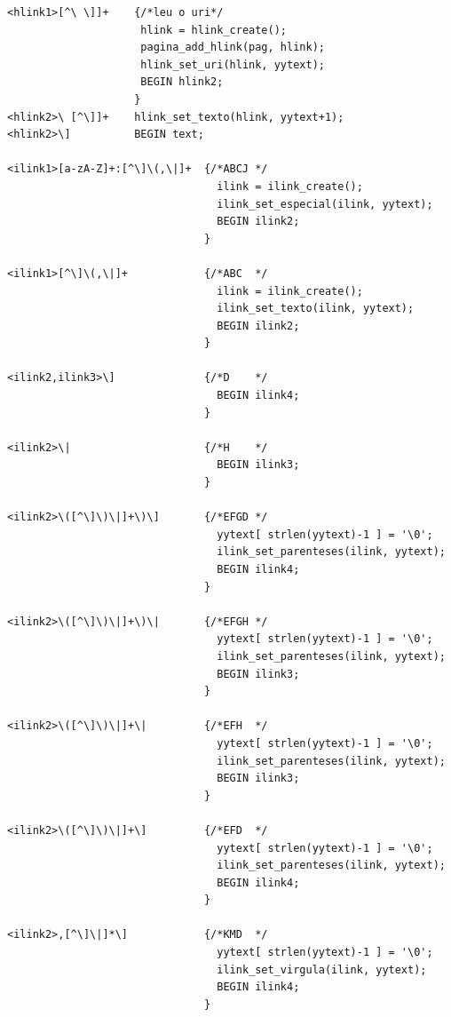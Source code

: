 \documentclass[11pt, a4paper, oneside]{article}
\begin{document}
\begin{verbatim}
<hlink1>[^\ \]]+    {/*leu o uri*/
                     hlink = hlink_create();
                     pagina_add_hlink(pag, hlink);
                     hlink_set_uri(hlink, yytext);
                     BEGIN hlink2;
                    }
<hlink2>\ [^\]]+    hlink_set_texto(hlink, yytext+1);
<hlink2>\]          BEGIN text;

<ilink1>[a-zA-Z]+:[^\]\(,\|]+  {/*ABCJ */
                                 ilink = ilink_create();
                                 ilink_set_especial(ilink, yytext);
                                 BEGIN ilink2;
                               }

<ilink1>[^\]\(,\|]+            {/*ABC  */
                                 ilink = ilink_create();
                                 ilink_set_texto(ilink, yytext);
                                 BEGIN ilink2;
                               }

<ilink2,ilink3>\]              {/*D    */
                                 BEGIN ilink4;
                               }

<ilink2>\|                     {/*H    */
                                 BEGIN ilink3;
                               }

<ilink2>\([^\]\)\|]+\)\]       {/*EFGD */
                                 yytext[ strlen(yytext)-1 ] = '\0';
                                 ilink_set_parenteses(ilink, yytext);
                                 BEGIN ilink4;
                               }

<ilink2>\([^\]\)\|]+\)\|       {/*EFGH */
                                 yytext[ strlen(yytext)-1 ] = '\0';
                                 ilink_set_parenteses(ilink, yytext);
                                 BEGIN ilink3;
                               }

<ilink2>\([^\]\)\|]+\|         {/*EFH  */
                                 yytext[ strlen(yytext)-1 ] = '\0';
                                 ilink_set_parenteses(ilink, yytext);
                                 BEGIN ilink3;
                               }

<ilink2>\([^\]\)\|]+\]         {/*EFD  */
                                 yytext[ strlen(yytext)-1 ] = '\0';
                                 ilink_set_parenteses(ilink, yytext);
                                 BEGIN ilink4;
                               }

<ilink2>,[^\]\|]*\]            {/*KMD  */
                                 yytext[ strlen(yytext)-1 ] = '\0';
                                 ilink_set_virgula(ilink, yytext);
                                 BEGIN ilink4;
                               }


\end{verbatim}
\end{document}
